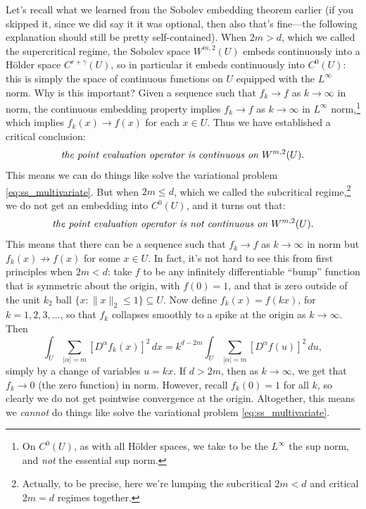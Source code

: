 \documentclass{article}
\begin{document}
Let's recall what we learned from the Sobolev embedding theorem earlier (if you
skipped it, since we did say it it was optional, then also that's fine---the 
following explanation should still be pretty self-contained). When $2m > d$,
which we called the supercritical regime, the Sobolev space $W^{m,2}(U)$ embeds
continuously into a H{\"o}lder space $C^{r+\gamma}(U)$, so in particular it
embeds continuously into $C^0(U)$: this is simply the space of continuous
functions on $U$ equipped with the $L^\infty$ norm. Why is this important?
Given a sequence such that $f_k \to f$ as $k \to \infty$ in
 norm, the continuous embedding property implies
$f_k \to f$ as $k \to \infty$ in $L^\infty$ norm,\footnote{On $C^0(U)$, as
  with all H{\"o}lder spaces, we take to be the $L^\infty$ the sup norm, and
  \emph{not} the essential sup norm.}  
which implies $f_k(x) \to f(x)$ for each $x \in U$. Thus we have established a
critical conclusion:
\[
\text{\emph{the point evaluation operator is continuous on $W^{m,2}(U)$}}. 
\]
This means we can do things like solve the variational problem
\eqref{eq:ss_multivariate}. But when $2m \leq d$, which we called the
subcritical regime,\footnote{Actually, to be precise, here we're lumping the
  subcritical $2m < d$ and critical $2m=d$ regimes together.}
we do not get an embedding into $C^0(U)$, and it turns out that:
\[
\text{\emph{the point evaluation operator is not continuous on $W^{m,2}(U)$}}.  
\]
This means that there can be a sequence such that $f_k \to f$ as $k \to \infty$ 
in  norm but $f_k(x) \not\to f(x)$ for some $x
\in U$. In fact, it's not hard to see this from first principles when $2m < d$:
take $f$ to be any infinitely differentiable ``bump'' function that is symmetric
about the origin, with $f(0) = 1$, and that is zero outside of the unit $k_2$
ball $\{x : \|x\|_2 \leq 1\} \subseteq U$. Now define $f_k(x) = f(k x)$, for
$k=1,2,3,\dots$, so that $f_k$ collapses smoothly to a spike at the origin as $k 
\to \infty$. Then 
\[
\int_U \sum_{|\alpha| = m} [D^\alpha f_k(x)]^2 \, dx = 
k^{d-2m} \int_U \sum_{|\alpha| = m} [D^\alpha f(u)]^2 \, du, 
\]
simply by a change of variables $u = k x$. If $d > 2m$, then as $k \to \infty$,
we get that $f_k \to 0$ (the zero function) in 
norm. However, recall $f_k(0) = 1$ for all $k$, so clearly we do not get
pointwise convergence at the origin. Altogether, this means we \emph{cannot} do
things like solve the variational problem \eqref{eq:ss_multivariate}.
\end{document}
